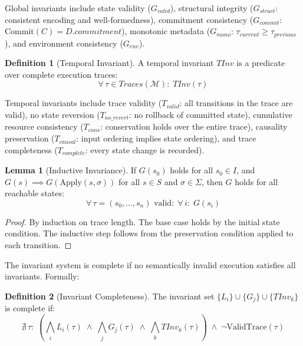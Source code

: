 \documentclass[11pt,a4paper]{article}
\theoremstyle{definition}
\newtheorem{definition}{Definition}[section]
\newtheorem{lemma}[theorem]{Lemma}
\newcommand{\Apply}{\mathrm{Apply}}
\newcommand{\Commit}{\mathrm{Commit}}
\newcommand{\ValidTrace}{\mathrm{ValidTrace}}
\begin{document}
Global invariants include state validity ($G_{\mathit{valid}}$), structural integrity ($G_{\mathit{struct}}$: consistent encoding and well-formedness), commitment consistency ($G_{\mathit{commit}}$: $\Commit(C) = D.\mathit{commitment}$), monotonic metadata ($G_{\mathit{mono}}$: $\tau_{\mathit{current}} \geq \tau_{\mathit{previous}}$), and environment consistency ($G_{\mathit{env}}$).

\begin{definition}[Temporal Invariant]
\label{def:temporal-invariant}
A temporal invariant $\mathit{TInv}$ is a predicate over complete execution traces:
\begin{equation}
\forall\, \tau \in \mathit{Traces}(\mathcal{M}):\; \mathit{TInv}(\tau)
\end{equation}
\end{definition}

Temporal invariants include trace validity ($T_{\mathit{valid}}$: all transitions in the trace are valid), no state reversion ($T_{\mathit{no\_revert}}$: no rollback of committed state), cumulative resource consistency ($T_{\mathit{cons}}$: conservation holds over the entire trace), causality preservation ($T_{\mathit{causal}}$: input ordering implies state ordering), and trace completeness ($T_{\mathit{complete}}$: every state change is recorded).

\begin{lemma}[Inductive Invariance]
\label{lem:inductive-invariance}
If $G(s_0)$ holds for all $s_0 \in I$, and $G(s) \implies G(\Apply(s, \sigma))$ for all $s \in S$ and $\sigma \in \Sigma$, then $G$ holds for all reachable states:
\begin{equation}
\forall\, \tau = (s_0, \ldots, s_n) \text{ valid}:\; \forall\, i:\; G(s_i)
\end{equation}
\end{lemma}

\begin{proof}
By induction on trace length. The base case holds by the initial state condition. The inductive step follows from the preservation condition applied to each transition.
\end{proof}

The invariant system is complete if no semantically invalid execution satisfies all invariants. Formally:

\begin{definition}[Invariant Completeness]
\label{def:invariant-completeness}
The invariant set $\{L_i\} \cup \{G_j\} \cup \{\mathit{TInv}_k\}$ is complete if:
\begin{equation}
\nexists\, \tau:\; \left(\bigwedge_i L_i(\tau) \;\land\; \bigwedge_j G_j(\tau) \;\land\; \bigwedge_k \mathit{TInv}_k(\tau)\right) \;\land\; \neg\ValidTrace(\tau)
\end{equation}
\end{definition}
\end{document}
